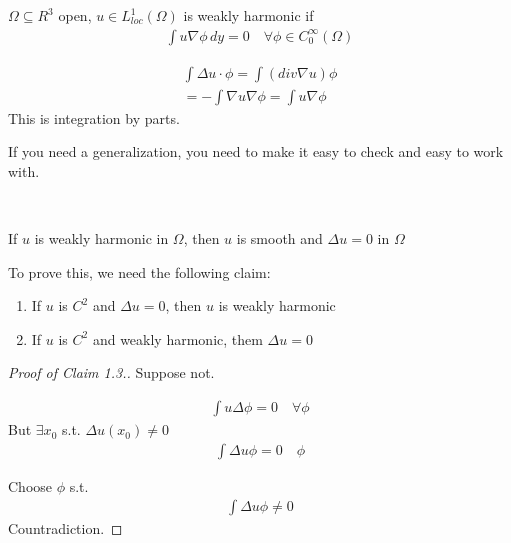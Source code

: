 \documentclass[11pt]{article}
\begin{document}
\vspace{7mm}
\begin{definition}
    $\Omega \subseteq  R^{3}$ open, $u \in L_{loc}^{1}(\Omega)$ is weakly harmonic
    if 
    \begin{align*}
        \int u \nabla \phi \, dy = 0 \quad \forall \phi \in C_{0}^{\infty}(\Omega)
    \end{align*}
\end{definition}
\begin{remark}
    \begin{align*}
        \int \Delta u \cdot \phi = \int (div \nabla u) \phi\\
        = - \int \nabla u \nabla \phi = \int u \nabla \phi
    \end{align*}
    This is integration by parts.
\end{remark}

If you need a generalization, you need to make it easy to check and easy
to work with.

\begin{lemma}
    \, 

    If $u$ is weakly harmonic in $\Omega$, then $u$ is smooth and
    $\Delta u = 0$ in $\Omega$
\end{lemma}

\vspace{7mm}
To prove this, we need the following claim:
\begin{claim}
    \begin{enumerate}
        \item If $u$ is $C^{2}$ and $\Delta u = 0$, then $u$ is weakly harmonic
        \item If $u$ is $C^{2}$ and weakly harmonic, them $\Delta u =0$
    \end{enumerate}    
\end{claim}

\begin{proof}[Proof of Claim 1.3.]
    Suppose not.

    \begin{align*}
        \int u \Delta \phi = 0 \quad \forall \phi
    \end{align*}
    But $\exists x_{0} $ s.t. $\Delta u(x_{0}) \neq 0$
    \begin{align*}
        \int \Delta u \phi = 0 \quad \phi
    \end{align*}

    Choose $\phi$ s.t.
    \begin{align*}
        \int \Delta u \phi \neq 0
    \end{align*}
    Countradiction.
\end{proof}
\end{document}
